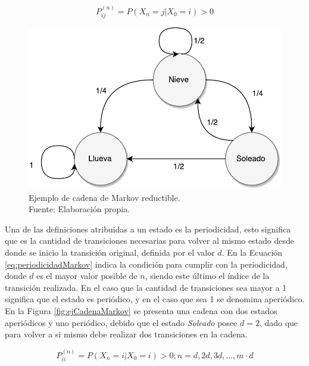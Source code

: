 \begin{equation} \label{eq:accesibleMarkov}
	P_{ij}^{(n)} = P(X_n = j | X_0 = i) > 0
\end{equation}

\begin{figure}[ht!]
	\centering
	\includegraphics[scale=0.5]{images/EjCadenaMarkov-Reductible.pdf}
	\caption[Ejemplo de cadena de Markov reductible.]{Ejemplo de cadena de Markov reductible.\\Fuente: Elaboración propia.}
	\label{fig:ejCadenaMarkov-Reductible}
\end{figure}

\normalsize{Una de las definiciones atribuidas a un estado es la periodicidad, esto significa que es la cantidad de transiciones necesarias para volver al mismo estado desde donde se inicio la transici\'on original, definida por el valor $d$. En la Ecuaci\'on} \ref{eq:periodicidadMarkov} \normalsize{indica la condici\'on para cumplir con la periodicidad, donde $d$ es el mayor valor posible de $n$, siendo este \'ultimo el \'indice de la transici\'on realizada. En el caso que la cantidad de transiciones sea mayor a 1 significa que el estado es peri\'odico, y en el caso que sea 1 se denomina aperi\'odico. En la Figura} \ref{fig:ejCadenaMarkov} \normalsize{se presenta una cadena con dos estados aperi\'odicos y uno peri\'odico, debido que el estado \textit{Soleado} posee $d=2$, dado que para volver a si mismo debe realizar dos transiciones en la cadena.}

\begin{equation} \label{eq:periodicidadMarkov}
	P_{ii}^{(n)} = P(X_n = i | X_0 = i) > 0 ; n = {d,2d,3d,..., m \cdot d}
\end{equation}

